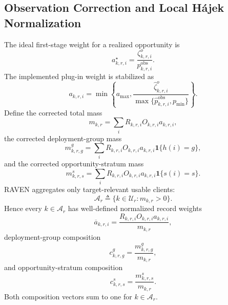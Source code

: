 \documentclass[letterpaper,journal]{IEEEtran}
\begin{document}
\subsection{Observation Correction and Local H\'ajek Normalization}
\label{subsec:observation_hajek}

The ideal first-stage weight for a realized opportunity is
\begin{equation}
    a^\star_{k,r,i}
    =
    \frac{\zeta^{o}_{k,r,i}}
         {p^{\mathrm{obs}}_{k,r,i}}.
    \label{eq:a_star}
\end{equation}
The implemented plug-in weight is stabilized as
\begin{equation}
 a_{k,r,i}
 =
 \min\!\left\{
 a_{\max},
 \frac{\widehat\zeta^{o}_{k,r,i}}
 {\max\{\widehat p^{\mathrm{obs}}_{k,r,i},p_{\min}\}}
 \right\}.
 \label{eq:a_stabilized}
\end{equation}
Define the corrected total mass
\begin{equation}
    m_{k,r}
    =
    \sum_i
    R_{k,r,i}O_{k,r,i}a_{k,r,i},
    \label{eq:m_total}
\end{equation}
the corrected deployment-group mass
\begin{equation}
 m^{g}_{k,r,g}
 =
 \sum_i
 R_{k,r,i}O_{k,r,i}a_{k,r,i}
 \mathbf{1}\{h(i)=g\},
 \label{eq:m_group}
\end{equation}
and the corrected opportunity-stratum mass
\begin{equation}
 m^{s}_{k,r,s}
 =
 \sum_i
 R_{k,r,i}O_{k,r,i}a_{k,r,i}
 \mathbf{1}\{s(i)=s\}.
 \label{eq:m_stratum}
\end{equation}
RAVEN aggregates only target-relevant usable clients:
\begin{equation}
    \mathcal{A}_r
    \triangleq
    \{k\in\mathcal{U}_r:m_{k,r}>0\}.
    \label{eq:aggregation_set}
\end{equation}
Hence every $k\in\mathcal{A}_r$ has well-defined normalized record weights
\begin{equation}
    \overline a_{k,r,i}
    =
    \frac{
    R_{k,r,i}O_{k,r,i}a_{k,r,i}
    }{m_{k,r}},
    \label{eq:abar}
\end{equation}
deployment-group composition
\begin{equation}
    c^{g}_{k,r,g}
    =
    \frac{m^{g}_{k,r,g}}{m_{k,r}},
    \label{eq:ckrg}
\end{equation}
and opportunity-stratum composition
\begin{equation}
    c^{s}_{k,r,s}
    =
    \frac{m^{s}_{k,r,s}}{m_{k,r}}.
    \label{eq:ckrs}
\end{equation}
Both composition vectors sum to one for $k\in\mathcal{A}_r$.
\end{document}
